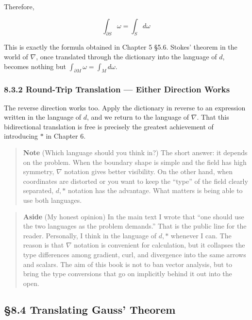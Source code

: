 \documentclass[a4paper,12pt,openany]{book}
\begin{document}
Therefore,

\[\int_{\partial S} \omega = \int_S d\omega\]

This is exactly the formula obtained in Chapter 5 §5.6. Stokes' theorem
in the world of \(\nabla\), once translated through the dictionary into
the language of \(d\), becomes nothing but
\(\int_{\partial M}\omega = \int_M d\omega\).

\hypertarget{round-trip-translation-either-direction-works}{%
\subsubsection{8.3.2 Round-Trip Translation — Either Direction
Works}\label{round-trip-translation-either-direction-works}}

The reverse direction works too. Apply the dictionary in reverse to an
expression written in the language of \(d\), and we return to the
language of \(\nabla\). That this bidirectional translation is free is
precisely the greatest achievement of introducing \(\ast\) in Chapter 6.

\begin{quote}
\textbf{Note} (Which language should you think in?) The short answer: it
depends on the problem. When the boundary shape is simple and the field
has high symmetry, \(\nabla\) notation gives better visibility. On the
other hand, when coordinates are distorted or you want to keep the
``type'' of the field clearly separated, \(d,\ast\) notation has the
advantage. What matters is being able to use both languages.
\end{quote}

\begin{quote}
\textbf{Aside} (My honest opinion) In the main text I wrote that ``one
should use the two languages as the problem demands.'' That is the
public line for the reader. Personally, I think in the language of
\(d,\ast\) whenever I can. The reason is that \(\nabla\) notation is
convenient for calculation, but it collapses the type differences among
gradient, curl, and divergence into the same arrows and scalars. The aim
of this book is not to ban vector analysis, but to bring the type
conversions that go on implicitly behind it out into the open.
\end{quote}

\par\vspace{0.35em}\par

\hypertarget{translating-gauss-theorem}{%
\subsection{§8.4 Translating Gauss'
Theorem}\label{translating-gauss-theorem}}
\end{document}
